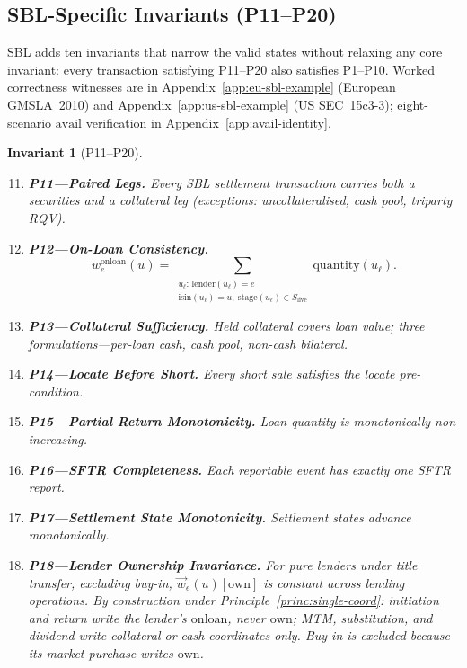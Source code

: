 \documentclass[11pt,a4paper]{article}
\newtheorem{invariant}[definition]{Invariant}
\begin{document}
\subsection{SBL-Specific Invariants (P11--P20)}
\label{sec:sbl-invariants}

SBL adds ten invariants that narrow the valid states without relaxing any core invariant: every transaction satisfying P11--P20 also satisfies P1--P10. Worked correctness witnesses are in Appendix~\ref{app:eu-sbl-example} (European GMSLA~2010) and Appendix~\ref{app:us-sbl-example} (US SEC~15c3-3); eight-scenario $\mathrm{avail}$ verification in Appendix~\ref{app:avail-identity}.

\begin{invariant}[P11--P20]
\label{inv:P11}\label{inv:P20}
\begin{enumerate}\setcounter{enumi}{10}
\item \textbf{P11---Paired Legs.} Every SBL settlement transaction carries both a securities and a collateral leg (exceptions: uncollateralised, cash pool, triparty RQV).
\item \textbf{P12---On-Loan Consistency.}
\[ w^{\mathrm{onloan}}_e(u) = \sum_{\substack{u_\ell:\,\mathrm{lender}(u_\ell)=e\\ \mathrm{isin}(u_\ell)=u,\ \mathrm{stage}(u_\ell)\in S_{\mathrm{live}}}} \mathrm{quantity}(u_\ell). \]
\item \textbf{P13---Collateral Sufficiency.} Held collateral covers loan value; three formulations---per-loan cash, cash pool, non-cash bilateral.
\item \textbf{P14---Locate Before Short.} Every short sale satisfies the locate pre-condition.
\item \textbf{P15---Partial Return Monotonicity.} Loan quantity is monotonically non-increasing.
\item \textbf{P16---SFTR Completeness.} Each reportable event has exactly one SFTR report.
\item \textbf{P17---Settlement State Monotonicity.} Settlement states advance monotonically.
\item \textbf{P18---Lender Ownership Invariance.} For pure lenders under title transfer, excluding buy-in, $\vec{w}_e(u)[\mathrm{own}]$ is constant across lending operations. By construction under Principle~\ref{princ:single-coord}: initiation and return write the lender's $\mathrm{onloan}$, never $\mathrm{own}$; MTM, substitution, and dividend write collateral or cash coordinates only. Buy-in is excluded because its market purchase writes $\mathrm{own}$.

\end{enumerate}
\end{invariant}
\end{document}
